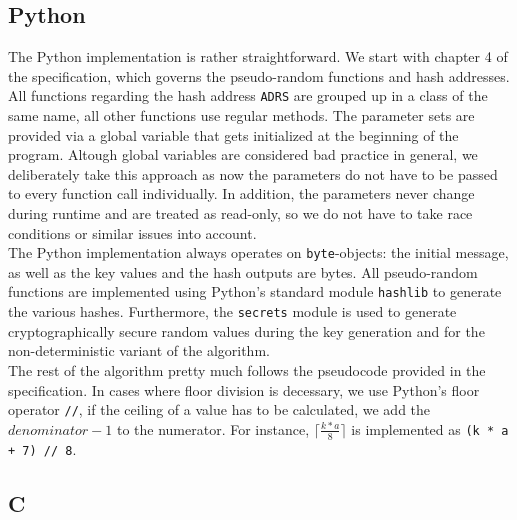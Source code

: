 \documentclass[journal=tosc,notanonymous]{iacrtrans}
\begin{document}
\subsection{Python}

The Python implementation is rather straightforward.
We start with chapter 4 of the specification, which governs the pseudo-random functions and hash addresses.
All functions regarding the hash address \texttt{ADRS} are grouped up in a class of the same name, all other functions use regular methods.
The parameter sets are provided via a global variable that gets initialized at the beginning of the program.
Altough global variables are considered bad practice in general, we deliberately take this approach as now the parameters do not have to be passed to every function call individually.
In addition, the parameters never change during runtime and are treated as read-only, so we do not have to take race conditions or similar issues into account.
\\
The Python implementation always operates on \texttt{byte}-objects: the initial message, as well as the key values and the hash outputs are bytes.
All pseudo-random functions are implemented using Python's standard module \texttt{hashlib} to generate the various hashes.
Furthermore, the \texttt{secrets} module is used to generate cryptographically secure random values during the key generation and for the non-deterministic variant of the algorithm.
\\
The rest of the algorithm pretty much follows the pseudocode provided in the specification.
In cases where floor division is decessary, we use Python's floor operator \texttt{//}, if the ceiling of a value has to be calculated, we add the $denominator - 1$ to the numerator.
For instance, $\lceil \frac{k * a}{8} \rceil$ is implemented as \texttt{(k * a + 7) // 8}.


\subsection{C}
\end{document}
